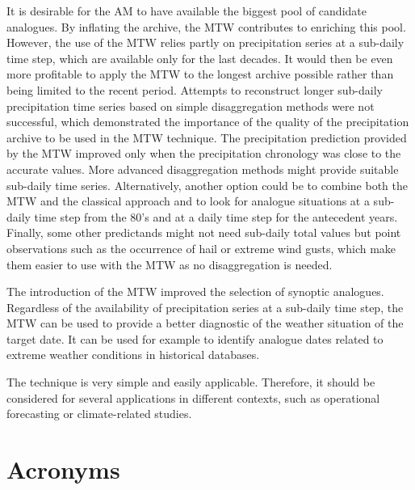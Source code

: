 \documentclass[hess, manuscript]{copernicus}
\begin{document}
	It is desirable for the AM to have available the biggest pool of candidate analogues. By inflating the archive, the MTW contributes to enriching this pool. However, the use of the MTW relies partly on precipitation series at a sub-daily time step, which are available only for the last decades. It would then be even more profitable to apply the MTW to the longest archive possible rather than being limited to the recent period. Attempts to reconstruct longer sub-daily precipitation time series based on simple disaggregation methods were not successful, which demonstrated the importance of the quality of the precipitation archive to be used in the MTW technique. The precipitation prediction provided by the MTW improved only when the precipitation chronology was close to the accurate values. More advanced disaggregation methods might provide suitable sub-daily time series. Alternatively, another option could be to combine both the MTW and the classical approach and to look for analogue situations at a sub-daily time step from the 80's and at a daily time step for the antecedent years. Finally, some other predictands might not need sub-daily total values but point observations such as the occurrence of hail or extreme wind gusts, which make them easier to use with the MTW as no disaggregation is needed.
	
	The introduction of the MTW improved the selection of synoptic analogues. Regardless of the availability of precipitation series at a sub-daily time step, the MTW can be used to provide a better diagnostic of the weather situation of the target date. It can be used for example to identify analogue dates related to extreme weather conditions in historical databases.

	The technique is very simple and easily applicable. Therefore, it should be considered for several applications in different contexts, such as operational forecasting or climate-related studies.
	
	
	\appendix
	\section{Acronyms}    %
	
\end{document}
